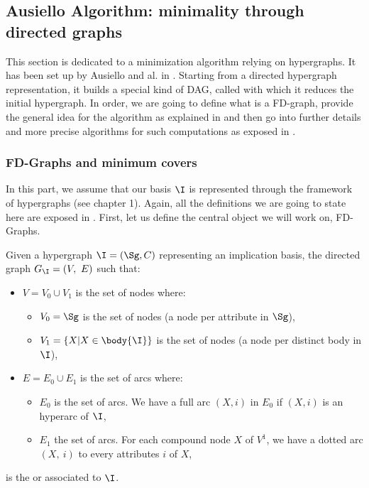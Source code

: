 \subsection{Ausiello Algorithm: minimality through directed graphs}

This section is dedicated to a minimization algorithm relying on hypergraphs. 
It has been set up by Ausiello and al. in \cite{ausiello_directed_2017, 
ausiello_graph_1983, ausiello_minimal_1986}. Starting from a directed hypergraph
representation, it builds a special kind of DAG, called  with
which it reduces the initial hypergraph. In order, we are going to define what
is a FD-graph, provide the general idea for the algorithm as explained in 
\cite{ausiello_minimal_1986} and then go into further details and more precise
algorithms for such computations as exposed in \cite{ausiello_graph_1983}.

\subsubsection{FD-Graphs and minimum covers}

In this part, we assume that our basis $\I$ is represented through the framework
of hypergraphs (see chapter 1). Again, all the definitions we are going to state
here are exposed in \cite{ausiello_graph_1983, ausiello_minimal_1986}. First,
let us define the central object we will work on, FD-Graphs.



\begin{definition} Given a hypergraph $\I = (\Sg, C)$ 
representing an implication basis, the directed graph $G_{\I} = (V, \  E)$ such 
that:
\begin{itemize}
	\item $V = V_0 \cup V_1$ is the set of nodes where:
		\begin{itemize}
			\item $V_0 = \Sg$ is the set of  nodes (a node
			per attribute in $\Sg$),
			\item $V_1 = \{X | X \in \body{\I} \}$ is the set of 
			 nodes (a node per distinct body in $\I$),
		\end{itemize}

	\item $E = E_0 \cup E_1$ is the set of arcs where:
		\begin{itemize}
			\item $E_0$ is the set of  arcs. We have a full arc 
			$(X, i)$ in	$E_0$ if $(X, i)$ is an hyperarc of $\I$,
			\item $E_1$ the set of  arcs. For each compound node 
			$X$ of $V^1$, we have a dotted arc $(X, \ i)$ to every attributes 
			$i$ of $X$,
		\end{itemize}

\end{itemize}
\noindent is the  or  
associated to $\I$.
\end{definition}


